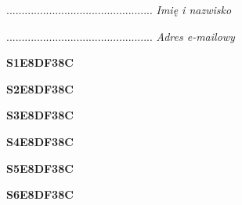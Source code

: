 \begin{turn}{90}\begin{minipage}{\linewidth} \vspace{20mm} ................................................  \textit{Imię i nazwisko}\end{minipage}\end{turn}

\begin{turn}{90}\begin{minipage}{\linewidth} \vspace{20mm} ................................................  \textit{Adres e-mailowy}\end{minipage}\end{turn}

\begin{turn}{90}\huge \begin{minipage}{\linewidth} \vspace{10mm}\textbf{S1E8DF38C}\end{minipage}\end{turn}

\begin{turn}{90}\huge \begin{minipage}{\linewidth} \vspace{10mm}\textbf{S2E8DF38C}\end{minipage}\end{turn}

\begin{turn}{90}\huge \begin{minipage}{\linewidth} \vspace{10mm}\textbf{S3E8DF38C}\end{minipage}\end{turn}

\begin{turn}{90}\huge \begin{minipage}{\linewidth} \vspace{10mm}\textbf{S4E8DF38C}\end{minipage}\end{turn}

\begin{turn}{90}\huge \begin{minipage}{\linewidth} \vspace{10mm}\textbf{S5E8DF38C}\end{minipage}\end{turn}

\begin{turn}{90}\huge \begin{minipage}{\linewidth} \vspace{10mm}\textbf{S6E8DF38C}\end{minipage}\end{turn}

